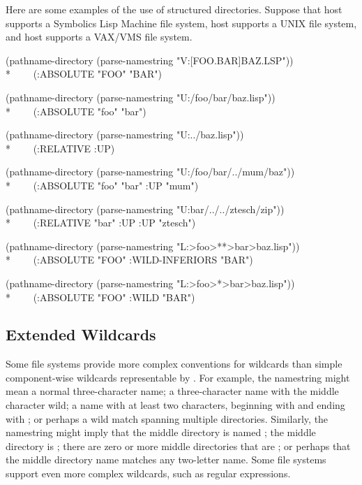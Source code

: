 Here are some examples of the use of structured directories.
Suppose that host  supports a Symbolics Lisp Machine file system,
host  supports a UNIX file system, and
host  supports a VAX/VMS file system.
\begin{lisp}
(pathname-directory (parse-namestring "V:[FOO.BAR]BAZ.LSP")) \\*
~~~\EV\ (:ABSOLUTE "FOO" "BAR")
\end{lisp}
\begin{lisp}
(pathname-directory (parse-namestring "U:/foo/bar/baz.lisp")) \\*
~~~\EV\ (:ABSOLUTE "foo" "bar")
\end{lisp}
\begin{lisp}
(pathname-directory (parse-namestring "U:../baz.lisp")) \\*
~~~\EV\ (:RELATIVE :UP)
\end{lisp}
\begin{lisp}
(pathname-directory (parse-namestring "U:/foo/bar/../mum/baz")) \\*
~~~\EV\ (:ABSOLUTE "foo" "bar" :UP "mum")
\end{lisp}
\begin{lisp}
(pathname-directory (parse-namestring "U:bar/../../ztesch/zip")) \\*
~~~\EV\ (:RELATIVE "bar" :UP :UP "ztesch")
\end{lisp}
\begin{lisp}
(pathname-directory (parse-namestring "L:>foo>**>bar>baz.lisp")) \\*
~~~\EV\ (:ABSOLUTE "FOO" :WILD-INFERIORS "BAR")
\end{lisp}
\begin{lisp}
(pathname-directory (parse-namestring "L:>foo>*>bar>baz.lisp")) \\*
~~~\EV\ (:ABSOLUTE "FOO" :WILD "BAR")
\end{lisp}

\subsection{Extended Wildcards}
\label{WILD-PATHNAME-SECTION}

  Some file systems provide more complex conventions for wildcards than
  simple component-wise wildcards representable by .
For example, the namestring  might mean a normal three-character
name; a three-character name with the middle character wild;
a name with at least two characters, beginning with  and ending with ;
or perhaps a wild match spanning multiple directories.  Similarly, the
namestring  might imply that the middle directory is
named ; the middle directory is ;
there are zero or more middle directories that are ;
or perhaps that the middle directory name matches any two-letter name.
Some file systems support even more complex wildcards, such as
  regular expressions.

